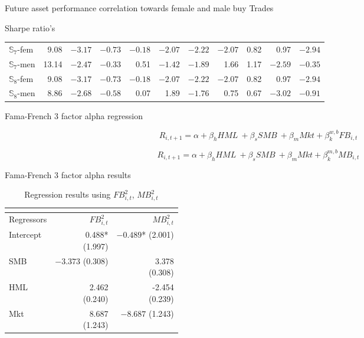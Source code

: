 \documentclass{beamer}
\begin{document}
\begin{frame}{Future asset performance correlation towards female and male buy Trades}
\begin{frame}{Sharpe ratio's}
\begin{table}[htbp]
\begin{tabular}{ lrrrrrrrrrr }
$\mathbb{S}_7$-fem&9.08&$-3.17$&$-0.73$&$-0.18$&$-2.07$&$-2.22$&$-2.07$&0.82&0.97&$-2.94$\\

$\mathbb{S}_7$-men&13.14&$-2.47$&$-0.33$&0.51&$-1.42$&$-1.89$&1.66&1.17&$-2.59$&$-0.35$\\

$\mathbb{S}_8$-fem&9.08&$-3.17$&$-0.73$&$-0.18$&$-2.07$&$-2.22$&$-2.07$&0.82&0.97&$-2.94$\\

$\mathbb{S}_8$-men&8.86&$-2.68$&$-0.58$&0.07&1.89&$-1.76$&0.75&0.67&$-3.02$&$-0.91$\\
 \bottomrule
\end{tabular}
\end{table}
    
\end{frame}

\begin{frame}{Fama-French 3 factor alpha regression}

 \begin{equation}
 \label{Fama-French-women}
    R_{i,t+1} = \alpha + \beta_hHML\ + \beta_sSMB\ + \beta_mMkt + \beta_k^{w,b}FB_{i,t}
\end{equation}

 \begin{equation}
 \label{Fama-French-men}
    R_{i,t+1} = \alpha + \beta_hHML\ + \beta_sSMB\ + \beta_mMkt + \beta_k^{m,b}MB_{i,t}
\end{equation}
    
\end{frame}

\begin{frame}{Fama-French 3 factor alpha results}
\begin{table}[htbp]
    \centering
    \caption{Regression results using $FB^2_{i,t}$, $MB^2_{i,t}$}
    \label{tab:Fama-French}
\begin{tabular}{ lrr } 
 \multicolumn{1}{c}{} \\
 \toprule
 Regressors &  $FB^2_{i,t}$ & $MB^2_{i,t}$  \\ 
  \midrule
Intercept& \shortstack{0.488* \\ (1.997)} & \shortstack{$-0.489$* \\ (2.001)} \\

SMB& \shortstack{$-3.373$ \\ (0.308)} & \shortstack{3.378 \\ (0.308)}\\
HML& \shortstack{ 2.462  \\ (0.240)}& \shortstack{-2.454 \\ (0.239)}\\
Mkt & \shortstack{8.687 \\ (1.243)} & \shortstack{$-8.687$ \\ (1.243)}\\


\end{tabular}
\end{table}
\end{frame}
\end{frame}
\end{document}
